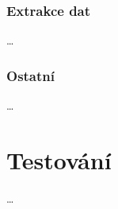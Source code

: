 \documentclass[thesis=B,czech]{FITthesis}[2012/06/26]
\begin{document}
\subsection{Extrakce dat}
\dots

\subsection{Ostatní}
\dots


\chapter{Testování}
\dots

\end{document}
